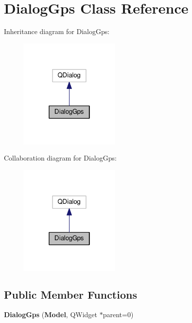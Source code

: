 \section{Dialog\+Gps Class Reference}
\label{class_dialog_gps}


Inheritance diagram for Dialog\+Gps\+:\nopagebreak
\begin{figure}[H]
\begin{center}
\leavevmode
\includegraphics[width=142pt]{class_dialog_gps__inherit__graph}
\end{center}
\end{figure}


Collaboration diagram for Dialog\+Gps\+:\nopagebreak
\begin{figure}[H]
\begin{center}
\leavevmode
\includegraphics[width=142pt]{class_dialog_gps__coll__graph}
\end{center}
\end{figure}
\subsection*{Public Member Functions}
\begin{DoxyCompactItemize}
\item 
{\bfseries Dialog\+Gps} ({\bf Model}, Q\+Widget $\ast$parent=0)\label{class_dialog_gps_a428f373cb4863b1937e6a8ab124f2c4d}

\end{DoxyCompactItemize}
